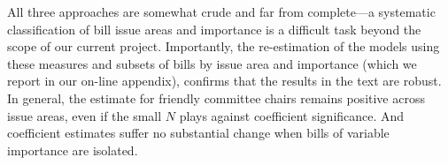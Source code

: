 \documentclass[article,letterpaper,times,12pt,listings-bw,microtype]{article}
\begin{document}


All three approaches are somewhat crude and far from complete---a systematic classification of bill issue areas and importance is a difficult task beyond the scope of our current project. Importantly, the re-estimation of the models using these measures and subsets of bills by issue area and importance (which we report in our on-line appendix), confirms that the results in the text are robust. In general, the estimate for friendly committee chairs remains positive across issue areas, even if the small $N$ plays against coefficient significance. And coefficient estimates suffer no substantial change when bills of variable importance are isolated. 
\end{document}
